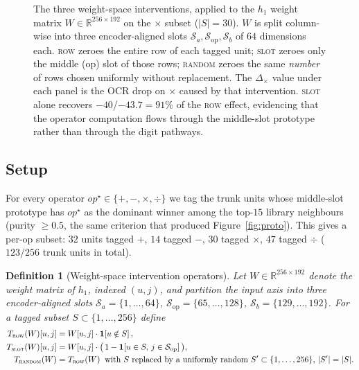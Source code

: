 \documentclass[11pt]{article}
\theoremstyle{papsty}
\newtheorem{definition}{Definition}
\newcommand{\R}{\mathbb{R}}
\begin{document}
\begin{figure}[t]
{%
  }
  \caption{The three weight-space interventions, applied to the
    $h_1$ weight matrix $W \in \R^{256 \times 192}$ on the $\times$
    subset ($|S|{=}30$). $W$ is split column-wise into three
    encoder-aligned slots $\mathcal{S}_a, \mathcal{S}_{\mathrm{op}},
    \mathcal{S}_b$ of $64$ dimensions each. \textsc{row} zeroes the
    entire row of each tagged unit; \textsc{slot} zeroes only the
    middle ($\mathrm{op}$) slot of those rows; \textsc{random} zeroes
    the same \emph{number} of rows chosen uniformly without
    replacement. The $\Delta_\times$ value under each panel is the
    OCR drop on $\times$ caused by that intervention.
    \textsc{slot} alone recovers $-40$/$-43.7 = 91\%$ of the \textsc{row}
    effect, evidencing that the operator computation flows through the
    middle-slot prototype rather than through the digit pathways.}
  \label{fig:projops}
\end{figure}

\subsection{Setup}
\label{sec:setup}

For every operator $op^\star\!\in\!\{+,-,\times,\div\}$ we tag the
trunk units whose middle-slot prototype has $op^\star$ as the dominant
winner among the top-$15$ library neighbours (purity $\ge 0.5$, the
same criterion that produced Figure~\ref{fig:proto}). This gives a
per-op subset:
$32$ units tagged $+$, $14$ tagged $-$, $30$ tagged $\times$, $47$
tagged $\div$ ($123 / 256$ trunk units in total).

\begin{definition}[Weight-space intervention operators]
\label{def:proj}
Let $W \in \R^{256 \times 192}$ denote the weight matrix of $h_1$,
indexed $(u, j)$, and partition the input axis into three
encoder-aligned slots
$\mathcal{S}_a = \{1,\dots,64\}$,
$\mathcal{S}_{\mathrm{op}} = \{65,\dots,128\}$,
$\mathcal{S}_b = \{129,\dots,192\}$.
For a tagged subset $S \subset \{1,\dots,256\}$ define
\begin{align}
T_{\textsc{row}}(W)[u, j]  &= W[u, j]\cdot \mathbf{1}\!\left[u \notin S\right], \\
T_{\textsc{slot}}(W)[u, j] &= W[u, j]\cdot
   \big(\,1 - \mathbf{1}\!\left[u \in S,\, j \in \mathcal{S}_{\mathrm{op}}\right]\big), \\
T_{\textsc{random}}(W)     &= T_{\textsc{row}}(W)\;\;\text{with $S$ replaced by a uniformly
    random $S' \subset \{1,\dots,256\}$, $|S'| = |S|$.}
\end{align}
\end{definition}
\end{document}
